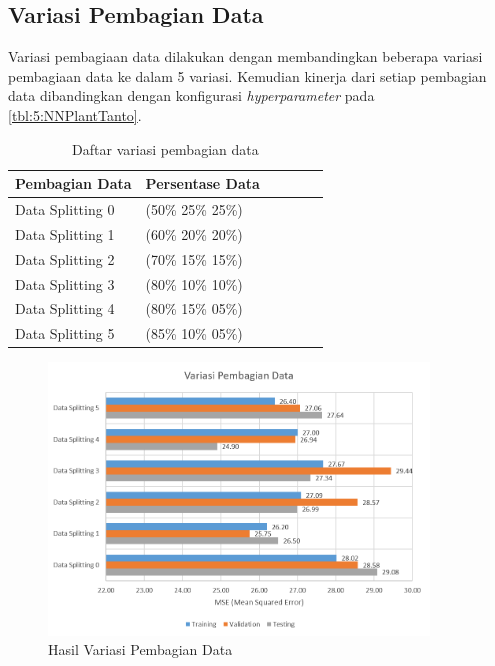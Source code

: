 \subsection{Variasi Pembagian Data} 

Variasi pembagiaan data dilakukan dengan membandingkan beberapa variasi pembagiaan data ke dalam 5 variasi. Kemudian kinerja dari setiap pembagian data dibandingkan dengan konfigurasi \textit{hyperparameter} pada \ref{tbl:5:NNPlantTanto}.

\begin{table}[h!]
	\caption{Daftar variasi pembagian data}
	\label{tbl:5:DataSplitting}
	\centering
	\begin{tabular}{|p{3cm}|p{3cm}|p{1.5cm}|p{1cm}|p{1.5cm}|p{1cm}|}
		\hline
		Pembagian Data   & Persentase Data \\ \hline
		Data Splitting 0 & (50\% 25\% 25\%)\\ \hline
		Data Splitting 1 & (60\% 20\% 20\%)\\ \hline
		Data Splitting 2 & (70\% 15\% 15\%)\\ \hline
		Data Splitting 3 & (80\% 10\% 10\%)\\ \hline
		Data Splitting 4 & (80\% 15\% 05\%)\\ \hline
		Data Splitting 5 & (85\% 10\% 05\%)\\ \hline
	\end{tabular}
\end{table}

\begin{figure}[!h]
	\centering
	\includegraphics[width=0.9\textwidth]{figures/DataSplittingResult}
	\caption{Hasil Variasi Pembagian Data}
	\label{fig:5:DataSplittingResult}
\end{figure}

